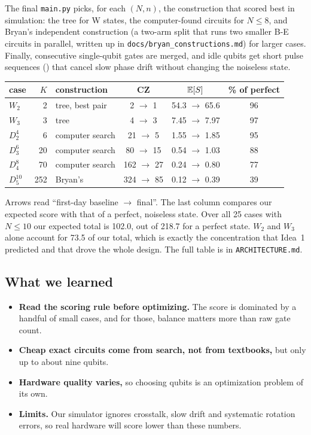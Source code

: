 \documentclass[11pt]{scrartcl}
\newcommand{\D}[2]{D^{#1}_{#2}}
\newcommand{\file}[1]{\texttt{\small #1}}
\begin{document}
The final \file{main.py} picks, for each $(N,n)$, the construction that scored best in simulation:
the tree for W states, the computer-found circuits for $N\le8$, and Bryan's independent
construction (a two-arm split that runs two smaller B-E circuits in parallel, written up in
\file{docs/bryan\_constructions.md}) for larger cases. Finally, consecutive single-qubit gates are
merged, and idle qubits get short pulse sequences () that cancel slow
phase drift without changing the noiseless state.

\begin{center}\small
\begin{tabular}{lrlccc}
  \toprule
  case & $K$ & construction & CZ & $\mathbb E[S]$ & \% of perfect\\
  \midrule
  $W_2$     &   2 & tree, best pair  &   2 $\to$ 1  & 54.3 $\to$ 65.6 & 96\\
  $W_3$     &   3 & tree             &   4 $\to$ 3  &  7.45 $\to$ 7.97 & 97\\
  $\D42$    &   6 & computer search  &  21 $\to$ 5  &  1.55 $\to$ 1.85 & 95\\
  $\D63$    &  20 & computer search  &  80 $\to$ 15 &  0.54 $\to$ 1.03 & 88\\
  $\D84$    &  70 & computer search  & 162 $\to$ 27 &  0.24 $\to$ 0.80 & 77\\
  $\D{10}5$ & 252 & Bryan's          & 324 $\to$ 85 &  0.12 $\to$ 0.39 & 39\\
  \bottomrule
\end{tabular}
\end{center}

Arrows read ``first-day baseline $\to$ final''. The last column compares our expected score with
that of a perfect, noiseless state. Over all 25 cases with $N\le10$ our expected total is 102.0, out
of 218.7 for a perfect state. $W_2$ and $W_3$ alone account for 73.5 of our total, which is exactly
the concentration that Idea~1 predicted and that drove the whole design. The full table is in
\file{ARCHITECTURE.md}.

\subsection*{What we learned}

\begin{itemize}
  \item \textbf{Read the scoring rule before optimizing.} The score is dominated by a handful of
        small cases, and for those, balance matters more than raw gate count.
  \item \textbf{Cheap exact circuits come from search, not from textbooks,} but only up to about
        nine qubits.
  \item \textbf{Hardware quality varies,} so choosing qubits is an optimization problem of its own.
  \item \textbf{Limits.} Our simulator ignores crosstalk, slow drift and systematic rotation errors,
        so real hardware will score lower than these numbers.
\end{itemize}



\end{document}
